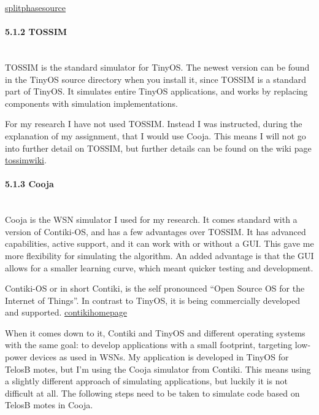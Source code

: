 \href{http://tinyos.stanford.edu/tinyos-wiki/index.php/Modules_and_the_TinyOS_Execution_Model}{splitphasesource}

\paragraph{5.1.2 TOSSIM\\\\}\label{tossim}

TOSSIM is the standard simulator for TinyOS. The newest version can be
found in the TinyOS source directory when you install it, since TOSSIM
is a standard part of TinyOS. It simulates entire TinyOS applications,
and works by replacing components with simulation implementations.

For my research I have not used TOSSIM. Instead I was instructed, during
the explanation of my assignment, that I would use Cooja. This means I
will not go into further detail on TOSSIM, but further details can be
found on the wiki page
\href{http://tinyos.stanford.edu/tinyos-wiki/index.php/TOSSIM}{tossimwiki}.

\paragraph{5.1.3 Cooja\\\\}\label{cooja}

Cooja is the WSN simulator I used for my research. It comes standard
with a version of Contiki-OS, and has a few advantages over TOSSIM. It
has advanced capabilities, active support, and it can work with or
without a GUI. This gave me more flexibility for simulating the
algorithm. An added advantage is that the GUI allows for a smaller
learning curve, which meant quicker testing and development.

Contiki-OS or in short Contiki, is the self pronounced ``Open Source OS
for the Internet of Things''. In contrast to TinyOS, it is being
commercially developed and supported.
\href{http://www.contiki-os.org/index.html}{contikihomepage}

When it comes down to it, Contiki and TinyOS and different operating
systems with the same goal: to develop applications with a small
footprint, targeting low-power devices as used in WSNs. My application
is developed in TinyOS for TelosB motes, but I'm using the Cooja
simulator from Contiki. This means using a slightly different approach
of simulating applications, but luckily it is not difficult at all. The
following steps need to be taken to simulate code based on TelosB motes
in Cooja.


